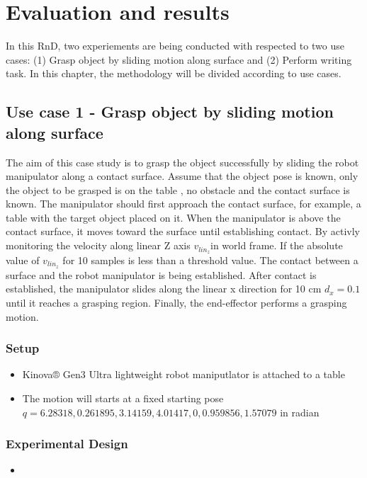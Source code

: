 \documentclass[report.tex]{subfiles}
\begin{document}
\chapter{Evaluation and results}
In this RnD, two experiements are being conducted with respected to two use cases: (1) Grasp object by sliding motion along surface and (2) Perform writing task. In this chapter, the methodology will be divided according to use cases.
    \section{Use case 1 - Grasp object by sliding motion along surface} 
    The aim of this case study is to grasp the object successfully by sliding the robot
    manipulator along a contact surface. Assume that the object pose is known, 
    only the object to be grasped is on the table , no obstacle  and the contact surface is known.
    The manipulator should first approach the contact surface, for example, a table
    with the target object placed on it. When the manipulator is above the contact
    surface, it moves toward the surface until establishing contact. By activly monitoring the velocity along linear Z axis $v_{lin_z}$in world frame.
    If the absolute value of $v_{lin_z}$ for 10 samples is less than a threshold value. The contact between a surface and the robot manipulator is being established.
    After contact is established, the manipulator slides along the linear x direction for 10 cm $d_{x} = 0.1$ until it reaches a grasping
    region. Finally, the end-effector performs a grasping motion.
        \subsection{Setup}
        \begin{itemize}
            \item Kinova® Gen3 Ultra lightweight robot maniputlator is attached to a table
            \item The motion will starts at a fixed starting pose $q = {6.28318,0.261895,3.14159,4.01417,0,0.959856,1.57079}$ in radian
        \end{itemize}
        \subsection{Experimental Design}
            \begin{itemize}
                \item 
            \end{itemize}
\end{document}
